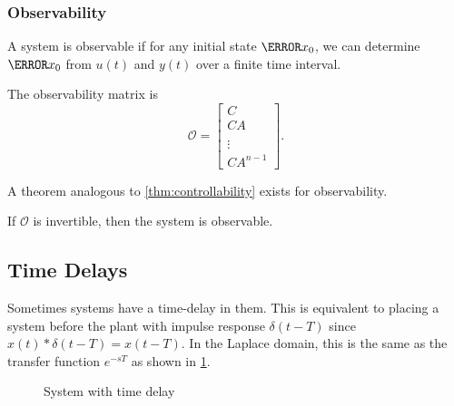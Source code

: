\subsubsection{Observability}
\begin{definition}
  A system is observable if for any initial state $\V{x}_0$, we can determine $\V{x}_0$ from $u(t)$ and $y(t)$ over a finite time interval.
  \label{defn:observability}
\end{definition}
\begin{definition}
  The observability matrix is
  \[
	\mathcal{O} = \begin{bmatrix} C \\ CA \\ \\ \vdots \\ CA^{n-1} \end{bmatrix}.
  \]
  \label{defn:observability-matrix}
\end{definition}
A theorem analogous to \cref{thm:controllability} exists for observability.
\begin{theorem}
  If $\mathcal{O}$ is invertible, then the system is observable.
  \label{thm:observability}
\end{theorem}
\subsection{Time Delays}
Sometimes systems have a time-delay in them. This is equivalent to placing a system before the plant with impulse response $\delta(t-T)$ since $x(t)*\delta(t-T) = x(t-T)$.
In the Laplace domain, this is the same as the transfer function $e^{-sT}$ as shown in \cref{fig:time-delay}.
\begin{figure}[H]
    \centering 
    \caption{System with time delay}
    \label{fig:time-delay}
\end{figure}

